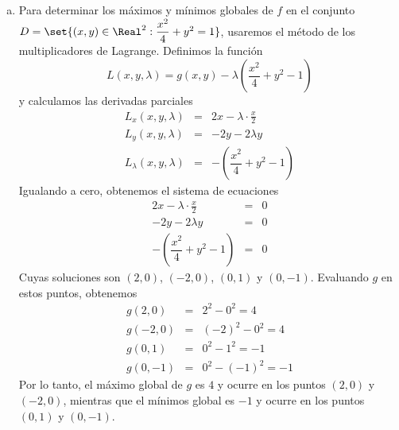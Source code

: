 \documentclass{article}
\begin{document}
\begin{enumerate}[a)]
\begin{enumerate}[i)]
\begin{eqnarray*}
            &=& 48\cdot 1\cdot 6\cdot 2 - (-12)^2 \\
            &=& 576 - 144 \\
            &=& 432 > 0.
        \end{eqnarray*}
        Además, $f_{xx}(1,2) = 48 > 0$, por lo que en el punto $(1,2)$ hay un mínimo local.
    \end{enumerate}
  \newpage
  \item Para determinar los máximos y mínimos globales de $f$ en el conjunto $D = \set{(x,y) \in \Real^2 : \dfrac{x^2}{4}+y^2 = 1}$, usaremos el método de los multiplicadores de Lagrange. Definimos la función
    $$L(x,y,\lambda) = g(x,y) - \lambda \left(\dfrac{x^2}{4}+y^2-1\right)$$
    y calculamos las derivadas parciales
    \begin{eqnarray*}
      L_x(x,y,\lambda) &=& 2x - \lambda\cdot \frac{x}{2} \\
      L_y(x,y,\lambda) &=& -2y - 2\lambda y \\
      L_\lambda(x,y,\lambda) &=& -\left(\dfrac{x^2}{4}+y^2-1\right)
    \end{eqnarray*}
    Igualando a cero, obtenemos el sistema de ecuaciones
    \begin{eqnarray*}
      2x - \lambda\cdot \frac{x}{2} &=& 0 \\
      -2y - 2\lambda y &=& 0 \\
      -\left(\dfrac{x^2}{4}+y^2-1\right) &=& 0
    \end{eqnarray*}
    Cuyas soluciones son $(2,0)$, $(-2,0)$, $(0,1)$ y $(0,-1)$. Evaluando $g$ en estos puntos, obtenemos
    \begin{eqnarray*}
      g(2,0) &=& 2^2 - 0^2 = 4 \\
      g(-2,0) &=& (-2)^2 - 0^2 = 4 \\
      g(0,1) &=& 0^2 - 1^2 = -1 \\
      g(0,-1) &=& 0^2 - (-1)^2 = -1
    \end{eqnarray*}
    Por lo tanto, el máximo global de $g$ es $4$ y ocurre en los puntos $(2,0)$ y $(-2,0)$, mientras que el mínimos global es $-1$ y ocurre en los puntos $(0,1)$ y $(0,-1)$.
\end{enumerate}
\end{document}
